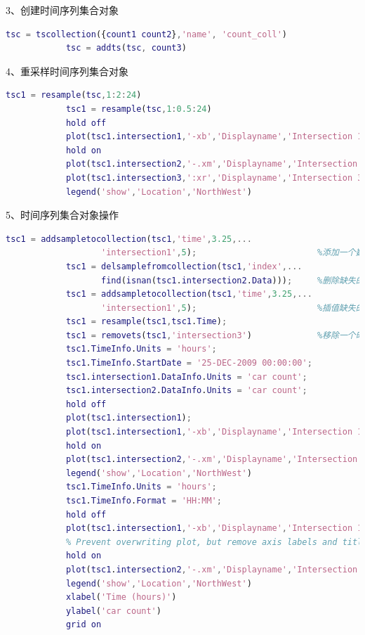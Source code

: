             3、创建时间序列集合对象
                \begin{lstlisting}[language=Matlab]
            tsc = tscollection({count1 count2},'name', 'count_coll')
            tsc = addts(tsc, count3)
                \end{lstlisting}
            4、重采样时间序列集合对象
                \begin{lstlisting}[language=Matlab]
            tsc1 = resample(tsc,1:2:24)
            tsc1 = resample(tsc,1:0.5:24)
            hold off
            plot(tsc1.intersection1,'-xb','Displayname','Intersection 1')
            hold on
            plot(tsc1.intersection2,'-.xm','Displayname','Intersection 2')
            plot(tsc1.intersection3,':xr','Displayname','Intersection 3')
            legend('show','Location','NorthWest')
                \end{lstlisting}
            5、时间序列集合对象操作
                \begin{lstlisting}[language=Matlab]
            tsc1 = addsampletocollection(tsc1,'time',3.25,...
                   'intersection1',5);                        %添加一个数据样本到时间序列集合对象
            tsc1 = delsamplefromcollection(tsc1,'index',...
                   find(isnan(tsc1.intersection2.Data)));     %删除缺失的数据
            tsc1 = addsampletocollection(tsc1,'time',3.25,...
                   'intersection1',5);                        %插值缺失的数据
            tsc1 = resample(tsc1,tsc1.Time);
            tsc1 = removets(tsc1,'intersection3')             %移除一个时间序列
            tsc1.TimeInfo.Units = 'hours';
            tsc1.TimeInfo.StartDate = '25-DEC-2009 00:00:00';
            tsc1.intersection1.DataInfo.Units = 'car count';
            tsc1.intersection2.DataInfo.Units = 'car count';
            hold off
            plot(tsc1.intersection1);
            plot(tsc1.intersection1,'-xb','Displayname','Intersection 1')
            hold on
            plot(tsc1.intersection2,'-.xm','Displayname','Intersection 2')
            legend('show','Location','NorthWest')
            tsc1.TimeInfo.Units = 'hours';
            tsc1.TimeInfo.Format = 'HH:MM';
            hold off
            plot(tsc1.intersection1,'-xb','Displayname','Intersection 1')
            % Prevent overwriting plot, but remove axis labels and title.
            hold on
            plot(tsc1.intersection2,'-.xm','Displayname','Intersection 2')
            legend('show','Location','NorthWest')
            xlabel('Time (hours)')
            ylabel('car count')
            grid on
                \end{lstlisting}
